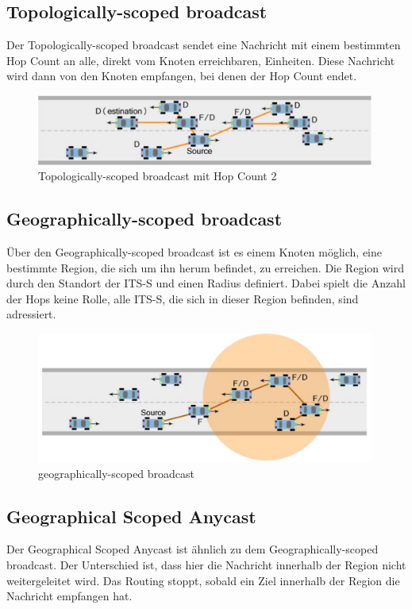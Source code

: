 \subsection{Topologically-scoped broadcast}
Der Topologically-scoped broadcast sendet eine Nachricht mit einem bestimmten Hop Count an alle, direkt vom  Knoten erreichbaren, Einheiten. Diese Nachricht wird dann von den Knoten empfangen, bei denen der Hop Count endet.

\begin{figure}[H]
	\includegraphics[width=0.99\textwidth]{content/images/03_networklayer/TSC.png}
	\caption{Topologically-scoped broadcast mit Hop Count 2 \cite{etsi102636-1}}
	\label{fig:tsc}
\end{figure}


\subsection{Geographically-scoped broadcast}
Über den Geographically-scoped broadcast ist es einem Knoten möglich, eine bestimmte Region, die sich um ihn herum befindet, zu erreichen. Die Region wird durch den Standort der \ac{ITS-S} und einen Radius definiert. Dabei spielt die Anzahl der Hops keine Rolle, alle \ac{ITS-S}, die sich in dieser Region befinden, sind adressiert.

\begin{figure}[H]
	\includegraphics[width=0.99\textwidth]{content/images/03_networklayer/GSB.png}
	\caption{geographically-scoped broadcast \cite{etsi102636-1}}
	\label{fig:gsb}
\end{figure}

\subsection{Geographical Scoped Anycast}
Der Geographical Scoped Anycast ist ähnlich zu dem Geographically-scoped broadcast. Der Unterschied ist, dass hier die Nachricht innerhalb der Region nicht weitergeleitet wird. Das Routing stoppt, sobald ein Ziel innerhalb der Region die Nachricht empfangen hat.

